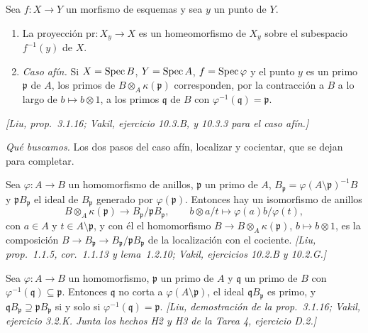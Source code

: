 \begin{teo}
\label{teo:s11-espacio-fibra}
Sea \(f\colon X\to Y\) un morfismo de esquemas y sea \(y\) un punto de \(Y\).
\begin{enumerate}[label=(\alph*)]
\item La proyección \(\mathrm{pr}\colon X_y\to X\) es un homeomorfismo de \(X_y\) sobre el subespacio \(f^{-1}(y)\) de \(X\).
\item \emph{Caso afín.} Si \(X=\operatorname{Spec} B\), \(Y=\operatorname{Spec} A\), \(f=\operatorname{Spec}\varphi\) y el punto \(y\) es un primo \(\mathfrak p\) de \(A\), los primos de \(B\otimes_A\kappa(\mathfrak p)\) corresponden, por la contracción a \(B\) a lo largo de \(b\mapsto b\otimes1\), a los primos \(\mathfrak q\) de \(B\) con \(\varphi^{-1}(\mathfrak q)=\mathfrak p\).
\end{enumerate}
\emph{[Liu, prop.~3.1.16; Vakil, ejercicio 10.3.B, y 10.3.3 para el caso afín.]}
\end{teo}

\emph{Qué buscamos.} Los dos pasos del caso afín, localizar y cocientar, que se dejan para completar.

\begin{lema}
\label{lema:s11-localizar-cocientar}
Sea \(\varphi\colon A\to B\) un homomorfismo de anillos, \(\mathfrak p\) un primo de \(A\), \(B_{\mathfrak p}=\varphi(A\setminus\mathfrak p)^{-1}B\) y \(\mathfrak pB_{\mathfrak p}\) el ideal de \(B_{\mathfrak p}\) generado por \(\varphi(\mathfrak p)\). Entonces hay un isomorfismo de anillos
\[
 B\otimes_A\kappa(\mathfrak p)\longrightarrow B_{\mathfrak p}/\mathfrak pB_{\mathfrak p},
 \qquad b\otimes a/t\longmapsto\varphi(a)b/\varphi(t),
\]
con \(a\in A\) y \(t\in A\setminus\mathfrak p\), y con él el homomorfismo \(B\to B\otimes_A\kappa(\mathfrak p)\), \(b\mapsto b\otimes1\), es la composición \(B\to B_{\mathfrak p}\to B_{\mathfrak p}/\mathfrak pB_{\mathfrak p}\) de la localización con el cociente. \emph{[Liu, prop.~1.1.5, cor.~1.1.13 y lema~1.2.10; Vakil, ejercicios 10.2.B y 10.2.G.]}
\end{lema}

\begin{afirm}
\label{afirm:s11-contraer-p}
Sea \(\varphi\colon A\to B\) un homomorfismo, \(\mathfrak p\) un primo de \(A\) y \(\mathfrak q\) un primo de \(B\) con \(\varphi^{-1}(\mathfrak q)\subseteq\mathfrak p\). Entonces \(\mathfrak q\) no corta a \(\varphi(A\setminus\mathfrak p)\), el ideal \(\mathfrak qB_{\mathfrak p}\) es primo, y \(\mathfrak qB_{\mathfrak p}\supseteq\mathfrak pB_{\mathfrak p}\) si y solo si \(\varphi^{-1}(\mathfrak q)=\mathfrak p\). \emph{[Liu, demostración de la prop.~3.1.16; Vakil, ejercicio 3.2.K. Junta los hechos H2 y H3 de la Tarea 4, ejercicio D.2.]}
\end{afirm}

